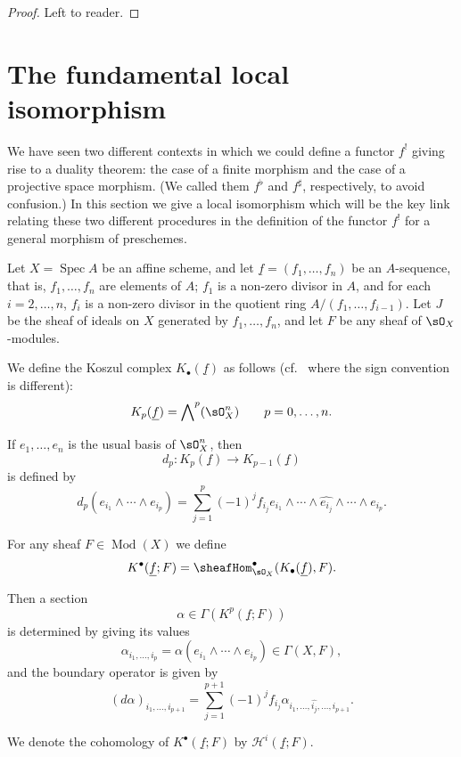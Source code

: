\begin{proof}
Left to reader.
\end{proof}
\section{The fundamental local isomorphism}\label{sec:3.7}

We have seen two different contexts in which we could define a functor $f^!$ giving rise to a duality theorem: the case of a finite morphism and the case of a projective space morphism. (We called them $f^{\flat}$ and $f^{\sharp}$, respectively, to avoid confusion.) In this section we give a local isomorphism which will be the key link relating these two different procedures in the definition of the functor $f^!$ for a general morphism of preschemes.

Let $X=\operatorname{Spec}A$ be an affine scheme, and let $\underline{f}=(f_1,\dots,f_n)$ be an $A$-sequence, that is, $f_1,\dots,f_n$ are elements of $A$; $f_1$ is a non-zero divisor in $A$, and for each $i=2,\dots,n$, $f_i$ is a non-zero divisor in the quotient ring $A/(f_1,\dots,f_{i-1})$. Let $J$ be the sheaf of ideals on $X$ generated by $f_1,\dots,f_n$, and let $F$ be any sheaf of $\sO_X$-modules.

We define the Koszul complex $K_\bullet(\underline{f})$ as follows (cf.\ \cite[\nopp III,~1.1]{EGA} where the sign convention is different):
\[
K_p(\underline{f}) = \bigwedge\nolimits^p (\sO_X^n) \qquad p=0,\dots,n.
\]

If $e_1,\dots,e_n$ is the usual basis of $\sO_X^n$, then
\[
d_p\colon K_p(\underline{f}) \longrightarrow K_{p-1}(\underline{f})
\]
is defined by
\[
d_p(e_{i_1}\wedge\cdots\wedge e_{i_p}) = \sum_{j=1}^p (-1)^j f_{i_j} e_{i_1}\wedge\cdots\wedge\widehat{e_{i_j}}\wedge\cdots\wedge e_{i_p}.
\]

For any sheaf $F\in\operatorname{Mod}(X)$ we define
\[
K^\bullet(\underline{f};F) = \sheafHom^\bullet_{\sO_X}(K_\bullet(\underline{f}), F).
\]

Then a section
\[
\alpha \in \Gamma(K^p(\underline{f};F))
\]
is determined by giving its values
\[
\alpha_{i_1,\dots,i_p} = \alpha(e_{i_1}\wedge\cdots\wedge e_{i_p}) \in \Gamma(X,F),
\]
and the boundary operator is given by
\[
(d\alpha)_{i_1,\dots,i_{p+1}} = \sum_{j=1}^{p+1} (-1)^j f_{i_j} \alpha_{i_1,\dots,\widehat{i_j},\dots,i_{p+1}}.
\]

We denote the cohomology of $K^\bullet(\underline{f};F)$ by $\mathcal{H}^i(\underline{f};F)$.

